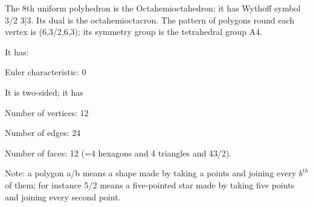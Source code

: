 The 8th uniform polyhedron is the Octahemioctahedron; it has Wythoff symbol 3/2 3|3. Its dual is the octahemioctacron. The pattern of polygons round each vertex is (6,3/2,6,3); its symmetry group is the tetrahedral group A4.\par
It has:\par
Euler characteristic: 0\par
It is two-sided; it has\par
Number of vertices: 12\par
Number of edges:  24\par
Number of faces: 12 (=4 hexagons and 4 triangles and 4{3/2}).\par
Note: a polygon a/b means a shape made by taking a points and joining every $b^{th}$  of them; for instance 5/2 means a five-pointed star made by taking five points and joining every second point.